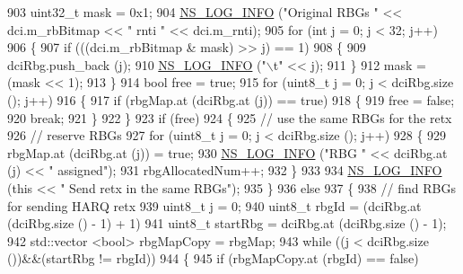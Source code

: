 \begin{DoxyCode}
903           uint32\_t mask = 0x1;
904           \hyperlink{group__logging_gafbd73ee2cf9f26b319f49086d8e860fb}{NS\_LOG\_INFO} (\textcolor{stringliteral}{"Original RBGs "} << dci.m\_rbBitmap << \textcolor{stringliteral}{" rnti "} << dci.m\_rnti);
905           \textcolor{keywordflow}{for} (\textcolor{keywordtype}{int} j = 0; j < 32; j++)
906             \{
907               \textcolor{keywordflow}{if} (((dci.m\_rbBitmap & mask) >> j) == 1)
908                 \{
909                   dciRbg.push\_back (j);
910                   \hyperlink{group__logging_gafbd73ee2cf9f26b319f49086d8e860fb}{NS\_LOG\_INFO} (\textcolor{stringliteral}{"\(\backslash\)t"} << j);
911                 \}
912               mask = (mask << 1);
913             \}
914           \textcolor{keywordtype}{bool} free = \textcolor{keyword}{true};
915           \textcolor{keywordflow}{for} (uint8\_t j = 0; j < dciRbg.size (); j++)
916             \{
917               \textcolor{keywordflow}{if} (rbgMap.at (dciRbg.at (j)) == \textcolor{keyword}{true})
918                 \{
919                   free = \textcolor{keyword}{false};
920                   \textcolor{keywordflow}{break};
921                 \}
922             \}
923           \textcolor{keywordflow}{if} (free)
924             \{
925               \textcolor{comment}{// use the same RBGs for the retx}
926               \textcolor{comment}{// reserve RBGs}
927               \textcolor{keywordflow}{for} (uint8\_t j = 0; j < dciRbg.size (); j++)
928                 \{
929                   rbgMap.at (dciRbg.at (j)) = \textcolor{keyword}{true};
930                   \hyperlink{group__logging_gafbd73ee2cf9f26b319f49086d8e860fb}{NS\_LOG\_INFO} (\textcolor{stringliteral}{"RBG "} << dciRbg.at (j) << \textcolor{stringliteral}{" assigned"});
931                   rbgAllocatedNum++;
932                 \}
933 
934               \hyperlink{group__logging_gafbd73ee2cf9f26b319f49086d8e860fb}{NS\_LOG\_INFO} (\textcolor{keyword}{this} << \textcolor{stringliteral}{" Send retx in the same RBGs"});
935             \}
936           \textcolor{keywordflow}{else}
937             \{
938               \textcolor{comment}{// find RBGs for sending HARQ retx}
939               uint8\_t j = 0;
940               uint8\_t rbgId = (dciRbg.at (dciRbg.size () - 1) + 1) %
941               uint8\_t startRbg = dciRbg.at (dciRbg.size () - 1);
942               std::vector <bool> rbgMapCopy = rbgMap;
943               \textcolor{keywordflow}{while} ((j < dciRbg.size ())&&(startRbg != rbgId))
944                 \{
945                   \textcolor{keywordflow}{if} (rbgMapCopy.at (rbgId) == \textcolor{keyword}{false})

\end{DoxyCode}
